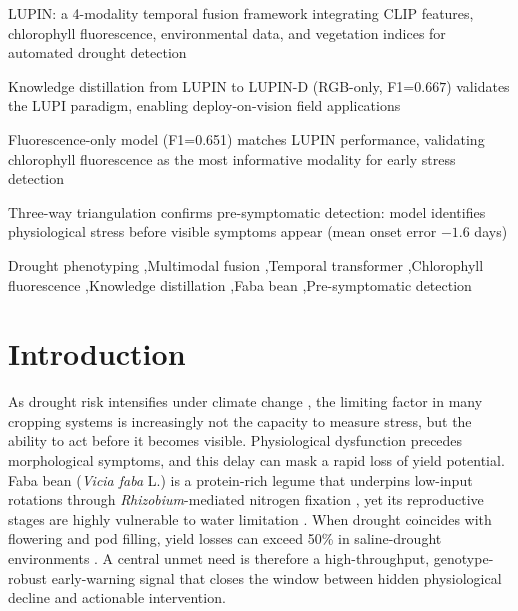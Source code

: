 \documentclass[a4paper,fleqn]{cas-dc}
\begin{document}
\begin{highlights}
\item LUPIN: a 4-modality temporal fusion framework integrating CLIP features, chlorophyll fluorescence, environmental data, and vegetation indices for automated drought detection
\item Knowledge distillation from LUPIN to LUPIN-D (RGB-only, F1=$0.667$) validates the LUPI paradigm, enabling deploy-on-vision field applications
\item Fluorescence-only model (F1=0.651) matches LUPIN performance, validating chlorophyll fluorescence as the most informative modality for early stress detection
\item Three-way triangulation confirms pre-symptomatic detection: model identifies physiological stress before visible symptoms appear (mean onset error $-1.6$ days)
\end{highlights}

\begin{keywords}
Drought phenotyping \sep Multimodal fusion \sep Temporal transformer \sep Chlorophyll fluorescence \sep Knowledge distillation \sep Faba bean \sep Pre-symptomatic detection
\end{keywords}

\maketitle

\section{Introduction}\label{sec:introduction}

As drought risk intensifies under climate change \citep{pathakClimateChangeTrends2018}, the limiting factor in many cropping systems is increasingly not the capacity to measure stress, but the ability to act before it becomes visible. Physiological dysfunction precedes morphological symptoms, and this delay can mask a rapid loss of yield potential. Faba bean (\textit{Vicia faba} L.) is a protein-rich legume that underpins low-input rotations through \textit{Rhizobium}-mediated nitrogen fixation \citep{hirschWhatMakesRhizobiaLegume2001}, yet its reproductive stages are highly vulnerable to water limitation \citep{desclauxImpactDroughtStress1996}. When drought coincides with flowering and pod filling, yield losses can exceed 50\% in saline-drought environments \citep{katerjiFabaBeanProductivity2011}. A central unmet need is therefore a high-throughput, genotype-robust early-warning signal that closes the window between hidden physiological decline and actionable intervention.
\end{document}
